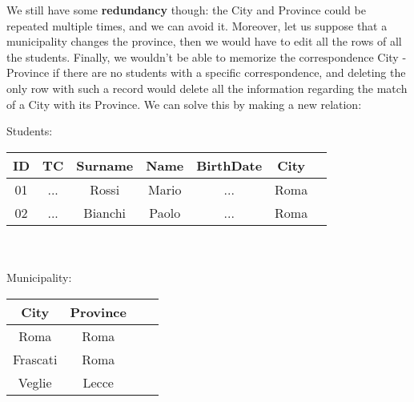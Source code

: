 We still have some \textbf{redundancy} though: the City and Province could be repeated multiple times, and we can avoid it. Moreover, let us suppose that a municipality changes the province, then we would have to edit all the rows of all the students. Finally, we wouldn't be able to memorize the correspondence City - Province if there are no students with a specific correspondence, and deleting the only row with such a record would delete all the information regarding the match of a City with its Province. We can solve this by making a new relation:

\begin{center}
    Students: \quad \begin{tabular}{|c|c|c|c|c|c|c|}
        \hline \rowcolor{maindoccol!60}
        \textbf{ID} & \textbf{TC} & \textbf{Surname} & \textbf{Name} & \textbf{BirthDate} & \textbf{City} \\
        \hline
        01 & ... & Rossi & Mario & ... & Roma \\
        \hline
        02 & ... & Bianchi & Paolo & ... & Roma \\
        \hline
    \end{tabular}
    \\
    \vspace{12pt}
    \\
    \vspace{12pt}
    Municipality: \quad \begin{tabular}{|c|c|c|c|}
        \hline \rowcolor{maindoccol!60}
        \textbf{City} & \textbf{Province} \\
        \hline
        Roma & Roma \\
        \hline
        Frascati & Roma \\
        \hline
        Veglie & Lecce \\
        \hline
    \end{tabular}
\end{center}

